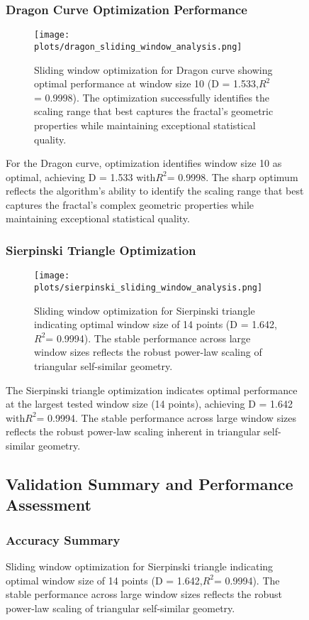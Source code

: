 \documentclass[preprint,12pt]{elsarticle}
\begin{document}
\begin{figure}[ht]
\subsubsection{Dragon Curve Optimization Performance}

\begin{figure}[ht]
\centering
\texttt{[image: plots/dragon\_sliding\_window\_analysis.png]}
\caption{Sliding window optimization for Dragon curve showing optimal performance at window size 10 (D = 1.533,$R^2$= 0.9998). The optimization successfully identifies the scaling range that best captures the fractal's geometric properties while maintaining exceptional statistical quality.}
\label{fig:dragon_optimization}
\end{figure}

For the Dragon curve, optimization identifies window size 10 as optimal, achieving D = 1.533 with$R^2$= 0.9998. The sharp optimum reflects the algorithm's ability to identify the scaling range that best captures the fractal's complex geometric properties while maintaining exceptional statistical quality.

\subsubsection{Sierpinski Triangle Optimization}

\begin{figure}[ht]
\centering
\texttt{[image: plots/sierpinski\_sliding\_window\_analysis.png]}
\caption{Sliding window optimization for Sierpinski triangle indicating optimal window size of 14 points (D = 1.642,$R^2$= 0.9994). The stable performance across large window sizes reflects the robust power-law scaling of triangular self-similar geometry.}
\label{fig:sierpinski_optimization}
\end{figure}

The Sierpinski triangle optimization indicates optimal performance at the largest tested window size (14 points), achieving D = 1.642 with$R^2$= 0.9994. The stable performance across large window sizes reflects the robust power-law scaling inherent in triangular self-similar geometry.

\subsection{Validation Summary and Performance Assessment}

\subsubsection{Accuracy Summary}


\end{figure}
\end{document}
